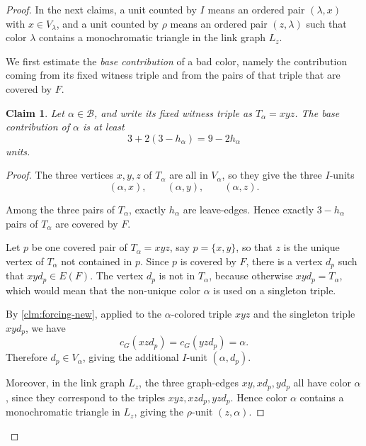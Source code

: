 \documentclass[10pt,a4paper]{amsart}
\newtheorem{claim}{Claim}
\newcommand{\cB}{\mathcal{B}}
\begin{document}
\begin{proof}
    In the next claims, a unit counted by \(I\) means an ordered pair
    \((\lambda,x)\) with \(x\in V_\lambda\), and a unit counted by \(\rho\)
    means an ordered pair \((z,\lambda)\) such that color \(\lambda\)
    contains a monochromatic triangle in the link graph \(L_z\).

    We first estimate the {\it base contribution} of a bad color, namely the
    contribution coming from its fixed witness triple and from the pairs of
    that triple that are covered by \(F\).


    \begin{claim}\label{clm:bad-base-new}
        Let $\alpha\in\cB$, and write its fixed witness triple as $T_\alpha=xyz$.
        The base contribution of
        $\alpha$ is at least
        \begin{equation}\label{eq:bad-base-new}
            3+2(3-h_\alpha)=9-2h_\alpha
        \end{equation}
        units.
    \end{claim}

    \begin{proof}
        The three vertices $x,y,z$ of $T_\alpha$ are all in $V_\alpha$, so
        they give the three $I$-units
        \[
            (\alpha,x),\qquad (\alpha,y),\qquad (\alpha,z).
        \]


        Among the three pairs of $T_\alpha$, exactly $h_\alpha$ are
        leave-edges.  Hence exactly $3-h_\alpha$ pairs of $T_\alpha$ are
        covered by $F$.

        Let $p$ be one covered pair of $T_\alpha=xyz$, say $p=\{x,y\}$, so that $z$ is the unique vertex of $T_\alpha$ not contained in $p$.
        Since $p$ is covered by $F$, there is a vertex $d_p$ such that $xyd_p\in E(F)$.
        The vertex $d_p$ is not in $T_\alpha$, because otherwise
        $xyd_p=T_\alpha$, which would mean that the non-unique color $\alpha$
        is used on a singleton triple.

        By \cref{clm:forcing-new}, applied to the $\alpha$-colored triple
        $xyz$ and the singleton triple $xyd_p$, we have
        \[
            c_G(xzd_p)=c_G(yzd_p)=\alpha.
        \]
        Therefore $d_p\in V_\alpha$, giving the additional $I$-unit $(\alpha,d_p)$.

        Moreover, in the link graph $L_z$, the three graph-edges $xy, xd_p,yd_p$ all have color $\alpha$, since they correspond to the triples
        $xyz,xzd_p,yzd_p$.
        Hence color $\alpha$ contains a monochromatic
        triangle in $L_z$, giving the $\rho$-unit $(z,\alpha)$.


\end{proof}
\end{proof}
\end{document}
